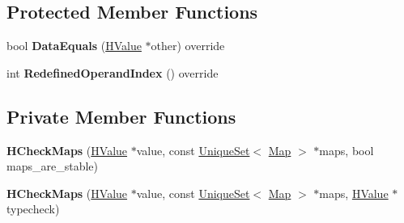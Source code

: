 \subsection*{Protected Member Functions}
\begin{DoxyCompactItemize}
\item 
bool {\bfseries Data\+Equals} (\hyperlink{classv8_1_1internal_1_1_h_value}{H\+Value} $\ast$other) override\hypertarget{classv8_1_1internal_1_1_h_check_maps_a9704ae8ef340afe3f572e6e6091469b9}{}\label{classv8_1_1internal_1_1_h_check_maps_a9704ae8ef340afe3f572e6e6091469b9}

\item 
int {\bfseries Redefined\+Operand\+Index} () override\hypertarget{classv8_1_1internal_1_1_h_check_maps_a247a1915ac878f6d72cfbfd4b5441b8d}{}\label{classv8_1_1internal_1_1_h_check_maps_a247a1915ac878f6d72cfbfd4b5441b8d}

\end{DoxyCompactItemize}
\subsection*{Private Member Functions}
\begin{DoxyCompactItemize}
\item 
{\bfseries H\+Check\+Maps} (\hyperlink{classv8_1_1internal_1_1_h_value}{H\+Value} $\ast$value, const \hyperlink{classv8_1_1internal_1_1_unique_set}{Unique\+Set}$<$ \hyperlink{classv8_1_1internal_1_1_map}{Map} $>$ $\ast$maps, bool maps\+\_\+are\+\_\+stable)\hypertarget{classv8_1_1internal_1_1_h_check_maps_a52d4e87895004263f37e183a77a2d2d9}{}\label{classv8_1_1internal_1_1_h_check_maps_a52d4e87895004263f37e183a77a2d2d9}

\item 
{\bfseries H\+Check\+Maps} (\hyperlink{classv8_1_1internal_1_1_h_value}{H\+Value} $\ast$value, const \hyperlink{classv8_1_1internal_1_1_unique_set}{Unique\+Set}$<$ \hyperlink{classv8_1_1internal_1_1_map}{Map} $>$ $\ast$maps, \hyperlink{classv8_1_1internal_1_1_h_value}{H\+Value} $\ast$typecheck)\hypertarget{classv8_1_1internal_1_1_h_check_maps_a124f060ad576387308a1675f1736754b}{}\label{classv8_1_1internal_1_1_h_check_maps_a124f060ad576387308a1675f1736754b}

\end{DoxyCompactItemize}
